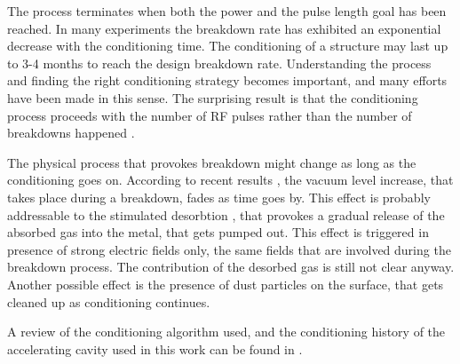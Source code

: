 The process terminates when both the power and the pulse length goal has been reached. In many experiments the breakdown rate has exhibited an exponential decrease with the conditioning time. The conditioning of a structure may last up to 3-4 months to reach the design breakdown rate. Understanding the process and finding the right conditioning strategy becomes important, and many efforts have been made in this sense. The surprising result is that the conditioning process proceeds with the number of RF pulses rather than the number of breakdowns happened \cite{Degiovanni:2065711}.

The physical process that provokes breakdown might change as long as the conditioning goes on. According to recent results \cite{Wuensch:583549}, the vacuum level increase, that takes place during a breakdown, fades as time goes by. This effect is probably addressable to the stimulated desorbtion \cite{soviet:1983}, that provokes a gradual release of the absorbed gas into the metal, that gets pumped out. This effect is triggered in presence of strong electric fields only, the same fields that are involved during the breakdown process. The contribution of the desorbed gas is still not clear anyway. Another possible effect is the presence of dust particles on the surface, that gets cleaned up as conditioning continues.

A review of the conditioning algorithm used, and the conditioning history of the accelerating cavity used in this work can be found in \cite{Degiovanni:1742280}.











